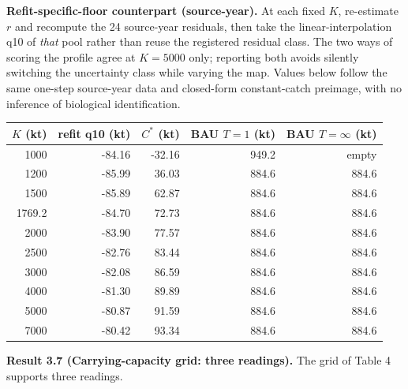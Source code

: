 \documentclass[11pt]{article}
\begin{document}
\noindent\textbf{Refit-specific-floor counterpart (source-year).} At each
fixed $K$, re-estimate $r$ and recompute the 24 source-year residuals,
then take the linear-interpolation q10 of \emph{that} pool rather than
reuse the registered residual class. The two ways of scoring the profile
agree at $K=5000$ only; reporting both avoids silently switching the
uncertainty class while varying the map. Values below follow the same
one-step source-year data and closed-form constant-catch preimage, with
no inference of biological identification.
\begin{center}\small
\begin{tabular}{rrrrr}\toprule
$K$ (kt)&refit q10 (kt)&$C^*$ (kt)&BAU $T=1$ (kt)&BAU $T=\infty$ (kt)\\
\midrule
1000 & -84.16 & -32.16 & 949.2 & empty \\
1200 & -85.99 & 36.03 & 884.6 & 884.6 \\
1500 & -85.89 & 62.87 & 884.6 & 884.6 \\
1769.2 & -84.70 & 72.73 & 884.6 & 884.6 \\
2000 & -83.90 & 77.57 & 884.6 & 884.6 \\
2500 & -82.76 & 83.44 & 884.6 & 884.6 \\
3000 & -82.08 & 86.59 & 884.6 & 884.6 \\
4000 & -81.30 & 89.89 & 884.6 & 884.6 \\
5000 & -80.87 & 91.59 & 884.6 & 884.6 \\
7000 & -80.42 & 93.34 & 884.6 & 884.6 \\
\bottomrule\end{tabular}\end{center}

\textbf{Result 3.7 (Carrying-capacity grid: three readings).} The grid
of Table 4 supports three readings.
\end{document}
